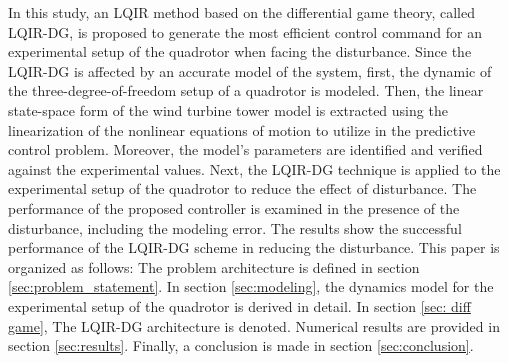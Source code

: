 \documentclass[conference]{IEEEtran}
\begin{document}
     In this study, an LQIR method based on the differential game theory, called LQIR-DG, is proposed to generate the most efficient control command for an experimental setup of the quadrotor when facing the disturbance. Since the LQIR-DG is affected by an accurate model of the system, first, the dynamic of the three-degree-of-freedom setup of a quadrotor is modeled. Then, the linear state-space form of the wind turbine tower model is extracted using the linearization of the nonlinear equations of motion to utilize in the predictive control problem. Moreover, the model's parameters are identified and verified against the experimental values. Next, the LQIR-DG technique is applied to the experimental setup of the quadrotor to reduce the effect of disturbance. The performance of the proposed controller is examined in the presence of the disturbance, including the modeling error. The results show the successful performance of the LQIR-DG scheme in reducing the disturbance.
     This paper is organized as follows: The problem architecture is defined in section \ref{sec:problem_statement}. In section \ref{sec:modeling}, the dynamics model for the experimental setup of the quadrotor is derived in detail. In section \ref{sec: diff game}, The LQIR-DG architecture is denoted. Numerical results are provided in section \ref{sec:results}. Finally, a conclusion is made in section \ref{sec:conclusion}.
\end{document}
